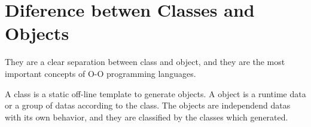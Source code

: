 \section{Diference betwen Classes and Objects}

They are a clear separation between 
class and object, and they are 
the most important concepts of O-O programming 
languages. \cite{Dahl:1970} 

A class is a static off-line 
template to generate objects. 
A object is a runtime data 
or a group of datas 
according to the class. The objects are 
independend datas with 
its own behavior, and 
they are classified by the classes 
which generated.


